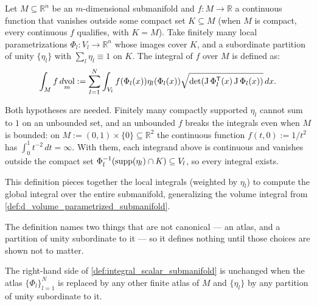 \begin{definition}
\label{def:integral_scalar_submanifold}
Let $M \subseteq \mathbb{R}^n$ be an $m$-dimensional submanifold and $f : M \to \mathbb{R}$ a
continuous function that vanishes outside some compact set $K \subseteq M$ (when $M$ is compact,
every continuous $f$ qualifies, with $K = M$). Take finitely many local parametrizations
$\Phi_l : V_l \to \mathbb{R}^n$ whose images cover $K$, and a subordinate partition of unity
$\{\eta_l\}$ with $\sum_l \eta_l \equiv 1$ on $K$. The integral of $f$ over $M$ is defined as:
\[\int_M f \mathop{d\text{vol}}_m := \sum_{l=1}^N \int_{V_l} f(\Phi_l(x)) \eta_l(\Phi_l(x)) \sqrt{\det(\operatorname{J}\Phi_l^{\mathsf{T}}(x) \operatorname{J}\Phi_l(x))} \,dx.\]
\end{definition}

Both hypotheses are needed. Finitely many compactly supported $\eta_l$ cannot sum to $1$ on an
unbounded set, and an unbounded $f$ breaks the integrals even when $M$ is bounded: on
$M := (0,1)\times\{0\} \subseteq \mathbb{R}^2$ the continuous function $f(t,0) := 1/t^2$ has
$\int_0^1 t^{-2}\,dt = \infty$. With them, each integrand above is continuous and vanishes outside
the compact set $\Phi_l^{-1}(\operatorname{supp}(\eta_l)\cap K) \subseteq V_l$, so every integral exists.

This definition pieces together the local integrals (weighted by $\eta_l$) to compute the global integral over the entire submanifold, generalizing the volume integral from \cref{def:d_volume_parametrized_submanifold}.

The definition names two things that are not canonical --- an atlas, and a partition of unity
subordinate to it --- so it defines nothing until those choices are shown not to matter.

\begin{proposition}
\label{prop:integral_over_submanifold_well_defined}
The right-hand side of \cref{def:integral_scalar_submanifold} is unchanged when the atlas
$\{\Phi_l\}_{l=1}^N$ is replaced by any other finite atlas of $M$ and $\{\eta_l\}$ by any
partition of unity subordinate to it.
\end{proposition}

